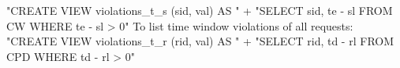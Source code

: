 "CREATE VIEW violations_t_s (sid, val) AS "
  + "SELECT sid, te - sl FROM CW WHERE te - sl > 0"
\nwendcode{}\nwdocspar
To list time window violations of all requests:
\nwenddocs{}\endmoddef{}
"CREATE VIEW violations_t_r (rid, val) AS "
  + "SELECT rid, td - rl FROM CPD WHERE td - rl > 0"
\nwendcode{}

\nwdocspar
\nwenddocs{}

